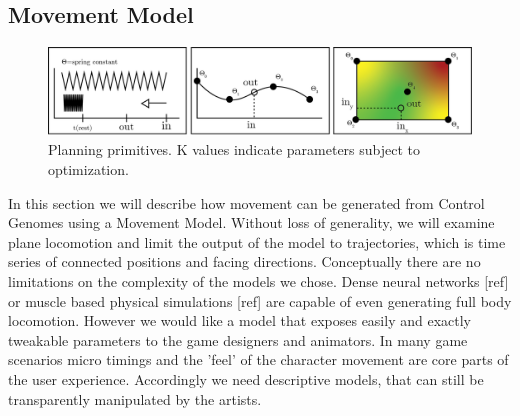\subsection{Movement Model}
\begin{figure}
    \centering
    \includegraphics[width=0.75\linewidth]{img/model_primitives}
    \caption{Planning primitives. K values indicate parameters subject to optimization.}
    \label{fig:movement:prims}
\end{figure}
In this section we will describe how movement can be generated from Control Genomes using a Movement Model. Without loss of generality, we will examine plane locomotion and limit the output of the model to trajectories, which is time series of connected positions and facing directions. 
Conceptually there are no limitations on the complexity of the models we chose. Dense neural networks [ref] or muscle based physical simulations [ref] are capable of even generating full body locomotion. However we would like a model that exposes easily and exactly tweakable parameters to the game designers and animators. In many game scenarios micro timings and the 'feel' of the character movement are core parts of the user experience. Accordingly we need descriptive models, that can still be transparently manipulated by the artists. 

